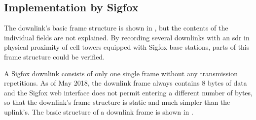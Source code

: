 \subsection{Implementation by Sigfox}
The downlink's basic frame structure is shown in \cite[Figure 1-2]{rs_appnote}, but the contents of the individual fields are not explained.
By recording several downlinks with an \gls{sdr} in physical proximity of cell towers equipped with Sigfox base stations, parts of this frame structure could be verified.

A Sigfox downlink consists of only one single frame without any transmission repetitions.
As of May 2018, the downlink frame always contains 8 bytes of data and the Sigfox web interface does not permit entering a different number of bytes, so that the downlink's frame structure is static and much simpler than the uplink's.
The basic structure of a downlink frame is shown in .

